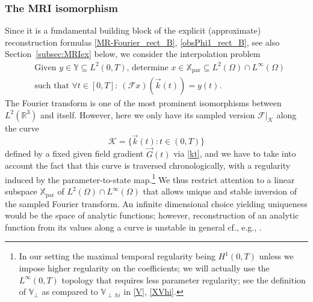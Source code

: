 \documentclass{ws-m3as}
\newcommand\Xpar{\mathbb{X}_{\text{par}}}
\newcommand{\revision}[1]{{ #1}}
\newcommand{\Margin}[1]{}
\begin{document}
\subsubsection{The MRI isomorphism}\label{subsec:MRIiso}
Since it is a fundamental building block of the explicit (approximate) reconstruction formulas \eqref{MR-Fourier_rect_B}, 
\eqref{obsPhi1_rect_B}, see also Section~\ref{subsec:MRIex} below, we consider the interpolation problem 
\[
\begin{aligned}
&\text{Given $y\in\mathbb{Y}\subseteq L^2(0,T)$, determine } x\in \Xpar \subseteq L^2(\Omega)\cap L^\infty(\Omega)\\
&\text{such that }\forall t\in[0,T]: \  (\mathcal{F}x)(\vec{k}(t))=y(t).
\end{aligned} 
\]
The Fourier transform is one of the most prominent isomorphisms between $L^2(\mathbb{R}^3)$ and itself.
However, here we only have its sampled version $\mathcal{F}\vert_{\mathcal{K}}$ along the curve 
\begin{equation}\label{K}
\mathcal{K}=\{\vec k(t):t\in(0,T)\}
\end{equation}
defined by a fixed given field gradient $\vec G(t)$ via \eqref{kt}, and we have to take into account the fact that this curve is traversed chronologically, with a regularity induced by the parameter-to-state map.\footnote{In our setting the maximal temporal regularity being $H^1(0,T)$ unless we impose higher regularity on the coefficients; we will actually use the $L^\infty(0,T)$ topology that requires less parameter regularity; see the definition of $\mathbb{V}_\perp$ as compared to $\mathbb{V}_{\perp\,hi}$ in \eqref{V}, \eqref{XVhi}.}    
We thus restrict attention to a linear subspace $\Xpar$ of $L^2(\Omega)\cap L^\infty(\Omega)$ that allows unique and stable inversion of the sampled Fourier transform.
An infinite dimensional choice yielding uniqueness would be the space of analytic functions; however, reconstruction of an analytic function from its values along a curve is unstable in general 
\revision{cf., e.g., \cite{LavrentievRomanovShishatskij1986}.}
\Margin{R2 7)}
\end{document}
